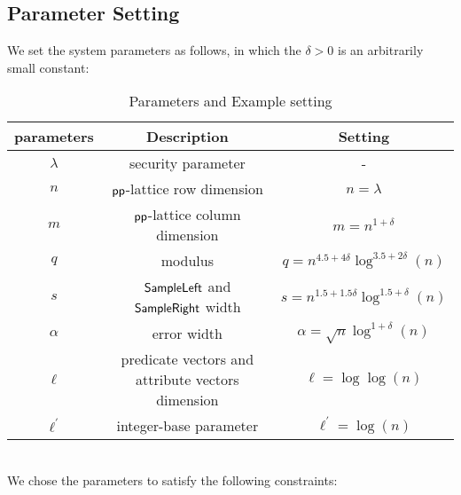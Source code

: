 \subsection{Parameter Setting}
We set the system parameters as follows, in which the $\delta>0$ is an arbitrarily small constant:
\begin{table}[htbp]
\centering
\begin{tabular}{|c|c|c|}
\hline parameters & Description & Setting\\
\hline $\lambda$ & security parameter & -\\
\hline $n$ & $\mathsf{pp}$-lattice row dimension & $n=\lambda$\\
\hline $m$ & $\mathsf{pp}$-lattice column dimension & $m=n^{1+\delta}$\\
\hline $q$ & modulus & $q=n^{4.5+4\delta}\log^{3.5+2\delta}(n)$\\
\hline $s$ & $\mathsf{SampleLeft}$ and $\mathsf{SampleRight}$ width & $s=n^{1.5+1.5\delta}\log^{1.5+\delta}(n)$\\
\hline $\alpha$ & error width & $\alpha=\sqrt{n}\log^{1+\delta}(n)$\\
\hline $\ell$ & predicate vectors and attribute vectors dimension & $\ell=\log\log(n)$\\
\hline $\ell^{'}$ & integer-base parameter & $\ell^{'}=\log(n)$\\
\hline
\end{tabular}
\setlength{\abovecaptionskip}{10pt}%
\setlength{\belowcaptionskip}{0pt}%
\caption{Parameters and Example setting}
\end{table}\\
We chose the parameters to satisfy the following constraints:
